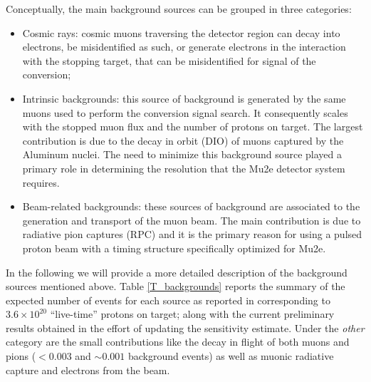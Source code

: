 \documentclass[12pt,a4paper,openright, oneside, titlepage]{book} %
\begin{document}
\noindent Conceptually, the main background sources can be grouped in three categories: 

\begin{itemize}
\item Cosmic rays: cosmic muons traversing the detector region can decay into electrons, be misidentified as such, or generate electrons in the interaction with the stopping target, that can be misidentified for signal of the conversion; 
\item Intrinsic backgrounds: this source of background is generated by the same muons used to perform the conversion signal search.
It consequently scales with the stopped muon flux and the number of protons on target. 
The largest contribution is due to the decay in orbit (DIO) of muons captured by the Aluminum nuclei. 
The need to minimize this background source played a primary role in determining the resolution that the Mu2e detector system requires.
\item Beam-related backgrounds: these sources of background are associated to the generation and transport of the muon beam. 
The main contribution is due to radiative pion captures (RPC) and it is the primary reason for using a pulsed proton beam with a timing structure specifically optimized  for Mu2e. 
\end{itemize}
In the following we will provide a more detailed description of the background sources mentioned above.
Table \ref{T_backgrounds} reports the summary of the expected number of events for each source as reported in \cite{CD3} corresponding to $3.6 \times 10^{20}$ ``live-time'' protons on target; along with the current preliminary results obtained in the effort of updating the sensitivity estimate. 
Under the \textit{other} category are the small contributions like the decay in flight of both muons and pions ($<0.003$ and $\sim 0.001$ background events) as well as muonic radiative capture and electrons from the beam.
\end{document}
